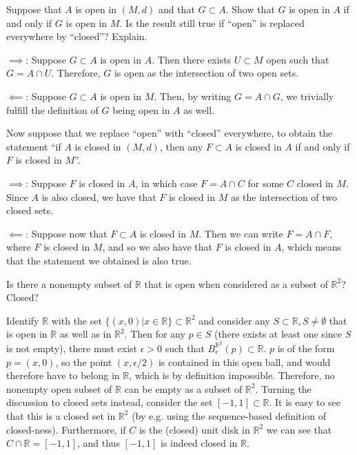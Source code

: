 \begin{exercise}{62}
    Suppose that $A$ is open in $(M, d)$ and that $G \subset A$.
    Show that $G$ is open in $A$ if and only if $G$ is open in $M$.
    Is the result still true if ``open'' is replaced everywhere by ``closed''? Explain.
\end{exercise}

\begin{solution}
    
    $\implies$: Suppose $G \subset A$ is open in $A$.
    Then there exists $U \subset M$ open such that $G = A \cap U$.
    Therefore, $G$ is open as the intersection of two open sets.

    $\impliedby$: Suppose $G \subset A$ is open in $M$.
    Then, by writing $G = A \cap G$, we trivially fulfill the definition of $G$ being open in $A$ as well.

    Now suppose that we replace ``open'' with ``closed'' everywhere, to obtain the statement ``if $A$ is closed in $(M, d)$, then any $F \subset A$ is closed in $A$ if and only if $F$ is closed in $M$''.

    $\implies$: Suppose $F$ is closed in $A$, in which case $F = A \cap C$ for some $C$ closed in $M$.
    Since $A$ is also closed, we have that $F$ is closed in $M$ as the intersection of two closed sets.

    $\impliedby$: Suppose now that $F \subset A$ is closed in $M$.
    Then we can write $F = A \cap F$, where $F$ is closed in $M$, and so we also have that $F$ is closed in $A$, which means that the statement we obtained is also true.
\end{solution}

\begin{exercise}{63}
    Is there a nonempty subset of $\mathbb{R}$ that is open when considered as a subset of $\mathbb{R}^2$? Closed?
\end{exercise}

\begin{solution}
    
    Identify $\mathbb{R}$ with the set $\{(x, 0) \lvert x \in \mathbb{R}\} \subset \mathbb{R}^2$ and consider any $S \subset \mathbb{R}, S \neq \emptyset$ that is open in $\mathbb{R}$ as well as in $\mathbb{R}^2$.
    Then for any $p \in S$ (there exists at least one since $S$ is not empty), there must exist $\epsilon > 0$ such that $B_{\epsilon}^{\mathbb{R}^2}(p) \subset \mathbb{R}$.
    $p$ is of the form $p = (x, 0)$, so the point $(x, \epsilon/2)$ is contained in this open ball, and would therefore have to belong in $\mathbb{R}$, which is by definition impossible.
    Therefore, no nonempty open subset of $\mathbb{R}$ can be empty as a subset of $\mathbb{R}^2$.
    Turning the discussion to closed sets instead, consider the set $[-1, 1] \subset \mathbb{R}$.
    It is easy to see that this is a closed set in $\mathbb{R}^2$ (by e.g. using the sequence-based definition of closed-ness).
    Furthermore, if $C$ is the (closed) unit disk in $\mathbb{R}^2$ we can see that $C \cap \mathbb{R} = [-1, 1]$, and thus $[-1, 1]$ is indeed closed in $\mathbb{R}$.
\end{solution}

